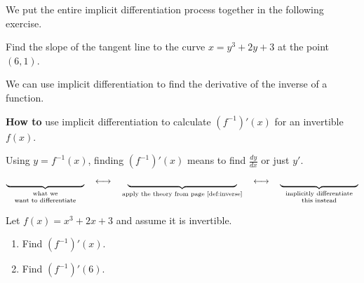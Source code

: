\documentclass[../main.tex]{subfiles}
\begin{document}
We put the entire implicit differentiation process together in the following exercise.
\begin{exercise} \label{ex:implicit-differentiation-inverse}
  Find the slope of the tangent line to the curve \(x = y^{3} + 2y + 3\) at the point \((6,1)\).

  \blanks*
\end{exercise}
\clearpage

We can use implicit differentiation to find the derivative of the inverse of a function.

\begin{mdframed}[style=simple-compact]
  \label{technique:implicit-differentiation-inverse}
  \textbf{How to} use implicit differentiation to calculate \((f^{-1})'(x)\) for an invertible \(f(x)\).

  Using  \(y = f^{-1}(x)\),
  finding \(\left(f^{-1}\right)'(x)\) means to find \(\tfrac{dy}{dx}\) or just \(y'\).
  \[
    \underbrace{\hspace{1.25in}}_{\parbox{1.25in}{\scriptsize\centering what we\\want to differentiate}}
    \quad\longleftrightarrow\quad
    \underbrace{\hspace{1.75in}}_{\text{apply the theory from page~\pageref{def:inverse}}}
    \quad\longleftrightarrow\quad \underbrace{\hspace{1.25in}}_{\parbox{1.25in}{\scriptsize\centering implicitly differentiate\\this instead}}
  \]
\end{mdframed}


\begin{example} \label{eg:implicit-differentiation-inverse-as-a-function}
  Let \(f(x) = x^{3} + 2x + 3\) and assume it is invertible.

  \begin{enumerate}[wide]
    \item Find \((f^{-1})'(x)\).


    \item Find \((f^{-1})'(6)\).

      \blanks*
  \end{enumerate}
\end{example}
\clearpage
\end{document}
